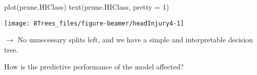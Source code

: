 \documentclass[
  10pt,
  ignorenonframetext,
]{beamer}
\newenvironment{Shaded}{\begin{snugshade}}{\end{snugshade}}
\newcommand{\AttributeTok}[1]{\textcolor[rgb]{0.77,0.63,0.00}{#1}}
\newcommand{\DecValTok}[1]{\textcolor[rgb]{0.00,0.00,0.81}{#1}}
\newcommand{\FunctionTok}[1]{\textcolor[rgb]{0.00,0.00,0.00}{#1}}
\newcommand{\NormalTok}[1]{#1}
\begin{document}
\begin{frame}[fragile]
\scriptsize

\begin{Shaded}
\begin{Highlighting}[]
\FunctionTok{plot}\NormalTok{(prune.HIClass)}
\FunctionTok{text}\NormalTok{(prune.HIClass, }\AttributeTok{pretty =} \DecValTok{1}\NormalTok{)}
\end{Highlighting}
\end{Shaded}

\begin{center}\texttt{[image: 8Trees\_files/figure-beamer/headInjury4-1]} \end{center}

\normalsize

\(\rightarrow\) No unnecessary splits left, and we have a simple and
interpretable decision tree.

How is the predictive performance of the model affected?
\end{frame}
\end{document}
